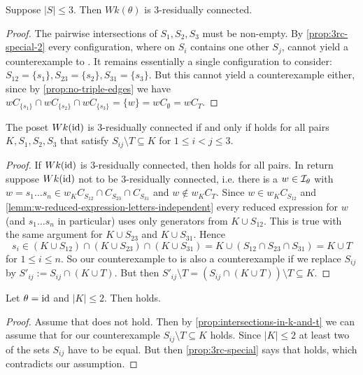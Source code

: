 \begin{coro}
	Suppose $|S| \leq 3$. Then $Wk(\theta)$ is 3-residually connected.

	\begin{proof}
		The pairwise intersections of $S_1,S_2,S_3$ must be non-empty. By \ref{prop:3rc-special-2} every configuration, where on $S_i$ contains one other $S_j$, cannot yield a counterexample to . It remains essentially a single configuration to consider: $S_{12} = \{s_1\}, S_{23} = \{s_2\}, S_{31} = \{s_3\}$. But this cannot yield a counterexample either, since by \ref{prop:no-triple-edges} we have $w C_{\{s_1\}} \cap w C_{\{s_2\}} \cap w C_{\{s_3\}} = \{ w \} = w C_\emptyset = w C_T$.
	\end{proof}
\end{coro}

\begin{prop}
	The poset $Wk(\operatorname{id})$ is 3-residually connected if and only if  holds for all pairs $K,S_1,S_2,S_3$ that satisfy $S_{ij} \setminus T \subseteq K$ for $1 \leq i < j \leq 3$.

	\begin{proof}
		If $Wk(\operatorname{id})$ is 3-residually connected, then  holds for all pairs. In return suppose $Wk(\operatorname{id})$ not to be 3-residually connected, i.e. there is a $w \in \mathcal{I}_{\theta}$ with $w = s_1 \ldots s_n \in w_K C_{S_{12}} \cap C_{S_{23}} \cap C_{S_{31}}$ and $w \notin w_K C_T$. Since $w \in w_K C_{S_{12}}$ and \ref{lemm:w-reduced-expression-letters-independent} every reduced expression for $w$ (and $s_1 \ldots s_n$ in particular) uses only generators from $K \cup S_{12}$. This is true with the same argument for $K \cup S_{23}$ and $K \cup S_{31}$. Hence
		$$ s_i \in (K \cup S_{12}) \cap (K \cup S_{23}) \cap (K \cup S_{31}) = K \cup (S_{12} \cap S_{23} \cap S_{31}) = K \cup T $$
		for $1 \leq i \leq n$. So our counterexample to  is also a counterexample if we replace $S_{ij}$ by $S'_{ij} := S_{ij} \cap (K \cup T)$. But then $S'_{ij} \setminus T = (S_{ij} \cap (K \cup T)) \setminus T \subseteq K$.
	\end{proof}
\end{prop}

\begin{coro}
	Let $\theta = \operatorname{id}$ and $|K| \leq 2$. Then  holds.

	\begin{proof}
		Assume that  does not hold. Then by \ref{prop:intersections-in-k-and-t} we can assume that for our counterexample $S_{ij} \setminus T \subseteq K$ holds. Since $|K| \leq 2$ at least two of the sets $S_{ij}$ have to be equal. But then \ref{prop:3rc-special} says that  holds, which contradicts our assumption.
	\end{proof}
\end{coro}